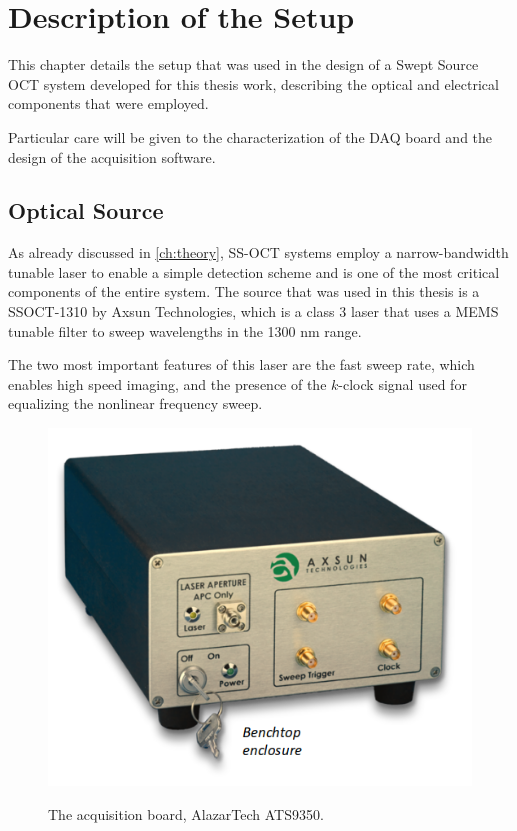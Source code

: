 
\chapter{Description of the Setup} %
\label{ch:setup} %

This chapter details the setup that was used in the design of a Swept Source OCT system developed for this thesis work, describing the optical and electrical components that were employed. 

\noindent Particular care will be given to the characterization of the \ac{DAQ} board and the design of the acquisition software. 

\section{Optical Source}
As already discussed in \autoref{ch:theory}, \ac{SS-OCT} systems employ a narrow-bandwidth tunable laser to enable a simple detection scheme and is one of the most critical components of the entire system. The source that was used in this thesis is a SSOCT-1310 by Axsun Technologies, which is a class 3 laser that uses a \ac{MEMS} tunable filter to sweep wavelengths in the 1300 nm range. 

The two most important features of this laser are the fast sweep rate, which enables high speed imaging, and the presence of the $k$-clock signal used for equalizing the nonlinear frequency sweep. 

\begin{figure}[bth]
	\myfloatalign
	{\includegraphics[width=.6\linewidth]{gfx/ch3/axsun}}
	\caption{The acquisition board, AlazarTech ATS9350.}\label{fig:axsun-laser}
\end{figure}

